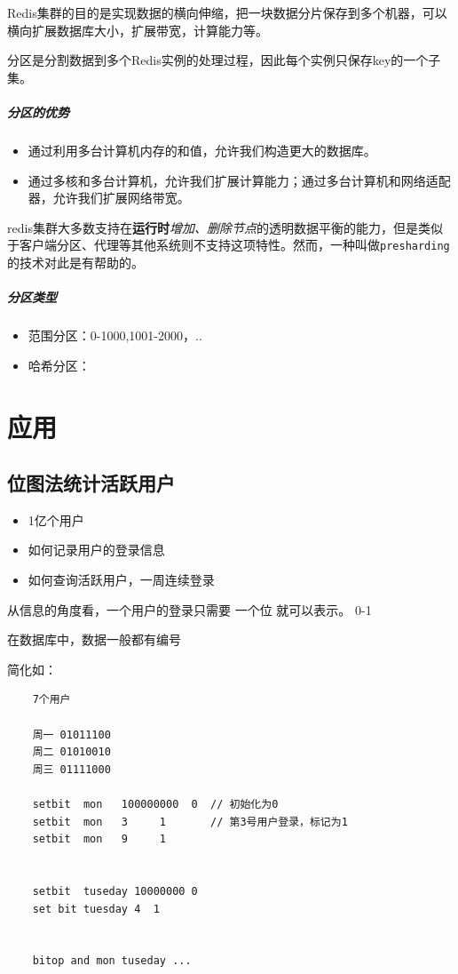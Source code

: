 \documentclass[UTF8,a4paper,12pt]{ctexbook}
\begin{document}
		Redis集群的目的是实现数据的横向伸缩，把一块数据分片保存到多个机器，可以横向扩展数据库大小，扩展带宽，计算能力等。 
		
		分区是分割数据到多个Redis实例的处理过程，因此每个实例只保存key的一个子集。

		\paragraph{分区的优势}
			\begin{itemize}
				\item 通过利用多台计算机内存的和值，允许我们构造更大的数据库。
				\item 通过多核和多台计算机，允许我们扩展计算能力；通过多台计算机和网络适配器，允许我们扩展网络带宽。
			\end{itemize}
		
		redis集群大多数支持在\textbf{运行时}\textit{增加、删除节点}的透明数据平衡的能力，但是类似于客户端分区、代理等其他系统则不支持这项特性。然而，一种叫做\verb|presharding|的技术对此是有帮助的。
		
		\paragraph{分区类型}
			\begin{itemize}
				\item 范围分区：0-1000,1001-2000，..
				\item 哈希分区：
			\end{itemize}
			
\chapter{应用}	
	\section{位图法统计活跃用户}
		\begin{itemize}
			\item 1亿个用户
			\item 如何记录用户的登录信息
			\item 如何查询活跃用户，一周连续登录
		\end{itemize}
	
		从信息的角度看，一个用户的登录只需要 一个位 就可以表示。 0-1
		
		在数据库中，数据一般都有编号
		
		简化如：
			\begin{lstlisting}
	7个用户
	
	周一 01011100
	周二 01010010
	周三 01111000
	
	setbit  mon   100000000  0  // 初始化为0
	setbit  mon   3     1       // 第3号用户登录，标记为1
	setbit  mon   9     1
	
	
	setbit  tuseday 10000000 0
	set bit tuesday 4  1
	

	bitop and mon tuseday ...
	
			\end{lstlisting}
\end{document}
